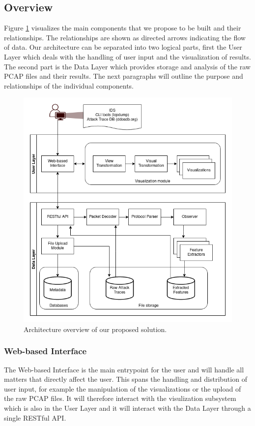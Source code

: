 \subsection{Overview}
Figure \ref{fig:architectureoverview} visualizes the main components that we propose to be built and their relationships. The relationships are shown as directed arrows indicating the flow of data. Our architecture can be separated into two logical parts, first the User Layer which deals with the handling of user input and the visualization of results. The second part is the Data Layer which provides storage and analysis of the raw PCAP files and their results. The next paragraphs will outline the purpose and relationships of the individual components.
\begin{figure}
    \centering
    \includegraphics[width=16cm]{images/Highlevel-approach.png}
    \caption{Architecture overview of our proposed solution.}
    \label{fig:architectureoverview}
\end{figure}

\subsubsection{Web-based Interface}
The Web-based Interface is the main entrypoint for the user and will handle all matters that directly affect the user. This spans the handling and distribution of user input, for example the manipulation of the visualizations or the upload of the raw PCAP files. It will therefore interact with the visulization subsystem which is also in the User Layer and it will interact with the Data Layer through a single RESTful API.

